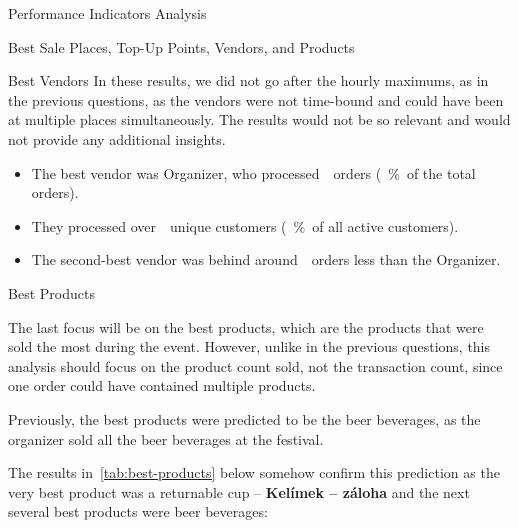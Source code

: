 \begin{section}{Performance Indicators Analysis}
\begin{subsection}{Best Sale Places, Top-Up Points, Vendors, and Products}
\begin{subsubsection}{Best Vendors}
			In these results, we did not go after the hourly maximums, as in the previous questions, as the vendors were not time-bound and could have been at multiple places simultaneously.
			The results would not be so relevant and would not provide any additional insights.

			\begin{keytakeaways}
				\begin{itemize}
					\item The best vendor was Organizer, who processed~~orders (~\%~of the total orders).
					\item They processed over~~unique customers (~\%~of all active customers).
					\item The second-best vendor was behind around~~orders less than the Organizer.
				\end{itemize}
			\end{keytakeaways}
		\end{subsubsection}

		\begin{subsubsection}{Best Products}
			\label{subsubsec:analysis-best-products}

			The last focus will be on the best products, which are the products that were sold the most during the event.
			However, unlike in the previous questions, this analysis should focus on the product count sold, not the transaction count, since one order could have contained multiple products.


			Previously, the best products were predicted to be the beer beverages, as the organizer sold all the beer beverages at the festival.

			The results in~\autoref{tab:best-products} below somehow confirm this prediction as the very best product was a returnable cup – \textbf{Kelímek – záloha} and the next several best products were beer beverages:


\end{subsubsection}
\end{subsection}
\end{section}
